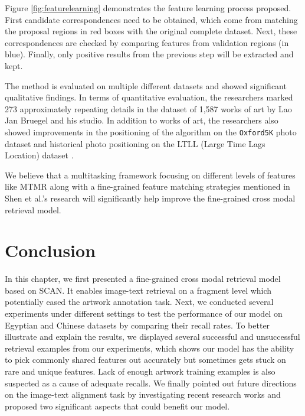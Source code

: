 Figure \ref{fig:featurelearning} demonstrates the feature learning process proposed. First candidate correspondences need to be obtained, which come from matching the proposal regions in red boxes with the original complete dataset. Next, these correspondences are checked by comparing features from validation regions (in blue). Finally, only positive results from the previous step will be extracted and kept. 

The method is evaluated on multiple different datasets and showed significant qualitative findings. In terms of quantitative evaluation, the researchers marked 273 approximately repeating details in the dataset of 1,587 works of art by Lao Jan Bruegel and his studio. In addition to works of art, the researchers also showed improvements in the positioning of the algorithm on the \verb|Oxford5K| photo dataset \cite{Philbin07} and historical photo positioning on the LTLL (Large Time Lags Location) dataset \cite{Fernando2015CVIU}.

We believe that a multitasking framework focusing on different levels of features like MTMR \cite{parttowhole} along with a fine-grained feature matching strategies mentioned in Shen et al.'s research \cite{shen2019discovering} will significantly help improve the fine-grained cross modal retrieval model.

\section{Conclusion}
In this chapter, we first presented a fine-grained cross modal retrieval model based on SCAN. It enables image-text retrieval on a fragment level which potentially eased the artwork annotation task. Next, we conducted several experiments under different settings to test the performance of our model on Egyptian and Chinese datasets by comparing their recall rates. To better illustrate and explain the results, we displayed several successful and unsuccessful retrieval examples from our experiments, which shows our model has the ability to pick commonly shared features out accurately but sometimes gets stuck on rare and unique features. Lack of enough artwork training examples is also suspected as a cause of adequate recalls. We finally pointed out future directions on the image-text alignment task by investigating recent research works and proposed two significant aspects that could benefit our model.

